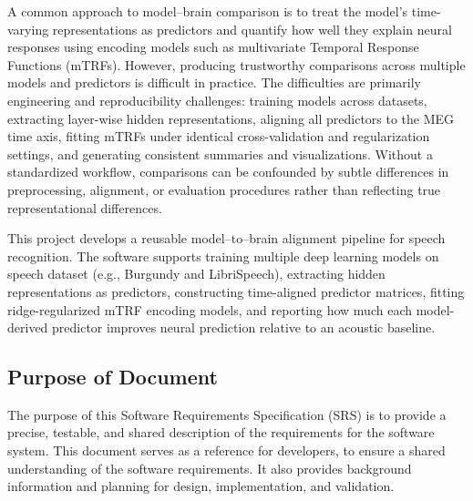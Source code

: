 \documentclass[12pt]{article}
\begin{document}
A common approach to model--brain comparison is to treat the model's time-varying representations as predictors and quantify how well they explain neural responses using encoding models such as multivariate Temporal Response Functions (mTRFs). 
However, producing trustworthy comparisons across multiple models and predictors is difficult in practice. The difficulties are primarily engineering and reproducibility challenges: training models across datasets, extracting layer-wise hidden representations, aligning all predictors to the MEG time axis, fitting mTRFs under identical cross-validation and regularization settings, and generating consistent summaries and visualizations.
Without a standardized workflow, comparisons can be confounded by subtle differences in preprocessing, alignment, or evaluation procedures rather than reflecting true representational differences.


This project develops a reusable model--to--brain alignment pipeline for speech recognition. The software supports training multiple deep learning models on speech dataset (e.g., Burgundy and LibriSpeech), extracting hidden representations as predictors, constructing time-aligned predictor matrices, fitting ridge-regularized mTRF encoding models, and reporting how much each model-derived predictor improves neural prediction relative to an acoustic baseline.








\subsection{Purpose of Document}


The purpose of this Software Requirements Specification (SRS) is to provide a precise, testable, and shared description of the requirements for the \progname{} software system. 
This document serves as a reference for developers, to ensure a shared understanding of the software requirements. It also provides background information and planning for design, implementation, and validation.
\end{document}

